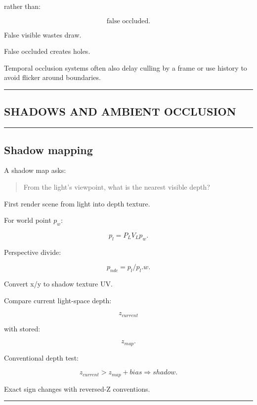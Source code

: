 rather than:

\[
\boxed{
\text{false occluded}.
}
\]

False visible wastes draw.

False occluded creates holes.

Temporal occlusion systems often also delay culling by a frame or use history to avoid flicker around boundaries.

\begin{center}\rule{0.5\linewidth}{0.5pt}\end{center}

\subsection{SHADOWS AND AMBIENT OCCLUSION}\label{04-visual-computing-ii-ch040-shadows-and-ambient-occlusion}

\begin{center}\rule{0.5\linewidth}{0.5pt}\end{center}

\subsection{Shadow mapping}\label{04-visual-computing-ii-ch040-shadow-mapping}

A shadow map asks:

\begin{quote}
From the light's viewpoint, what is the nearest visible depth?
\end{quote}

First render scene from light into depth texture.

For world point \(p_w\):

\[
p_l=
P_LV_Lp_w.
\]

Perspective divide:

\[
p_{ndc}
=
p_l/p_l.w.
\]

Convert x/y to shadow texture UV.

Compare current light-space depth:

\[
z_{current}
\]

with stored:

\[
z_{map}.
\]

Conventional depth test:

\[
\boxed{
z_{current}
>
z_{map}+bias
\Rightarrow
shadow.
}
\]

Exact sign changes with reversed-Z conventions.

\begin{center}\rule{0.5\linewidth}{0.5pt}\end{center}

